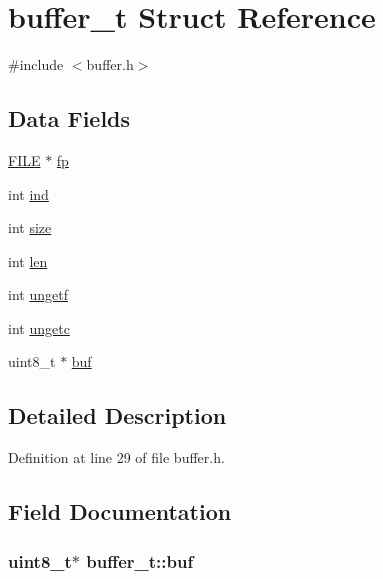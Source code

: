 \hypertarget{structbuffer__t}{}\section{buffer\+\_\+t Struct Reference}
\label{structbuffer__t}


{\ttfamily \#include $<$buffer.\+h$>$}

\subsection*{Data Fields}
\begin{DoxyCompactItemize}
\item 
\hyperlink{posix_8h_aed4dabeb9f7c518ded42f930a04abce8}{F\+I\+LE} $\ast$ \hyperlink{structbuffer__t_a00a55014e0827223c41b1b1d56e5be5d}{fp}
\item 
int \hyperlink{structbuffer__t_a59ea992e5006ead050862bae5c41670a}{ind}
\item 
int \hyperlink{structbuffer__t_a34e81d898c6accf4f06ed9c1133d6361}{size}
\item 
int \hyperlink{structbuffer__t_a0b67fc6880d331ae05dab0e58a4584c2}{len}
\item 
int \hyperlink{structbuffer__t_a67c2edddeca1858c670ff57e049a9e0e}{ungetf}
\item 
int \hyperlink{structbuffer__t_aa1fbbf42ce5d6278b21a93647bef3ff1}{ungetc}
\item 
uint8\+\_\+t $\ast$ \hyperlink{structbuffer__t_ab98e4f2d4fe10a680089d291ef1907c7}{buf}
\end{DoxyCompactItemize}


\subsection{Detailed Description}


Definition at line 29 of file buffer.\+h.



\subsection{Field Documentation}
\subsubsection[{\texorpdfstring{buf}{buf}}]{\setlength{\rightskip}{0pt plus 5cm}uint8\+\_\+t$\ast$ buffer\+\_\+t\+::buf}\hypertarget{structbuffer__t_ab98e4f2d4fe10a680089d291ef1907c7}{}\label{structbuffer__t_ab98e4f2d4fe10a680089d291ef1907c7}


